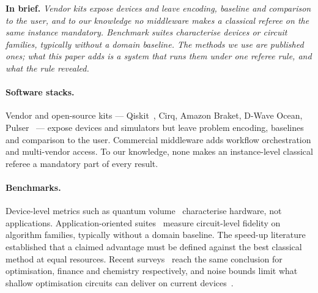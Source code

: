 \documentclass[11pt,a4paper]{article}
\newcommand{\inbrief}[1]{\par\smallskip\noindent\textbf{In brief.} \emph{#1}\par\medskip}
\begin{document}
\inbrief{Vendor kits expose devices and leave encoding, baseline and
comparison to the user, and to our knowledge no middleware makes a classical
referee on the same instance mandatory. Benchmark suites characterise devices
or circuit families, typically without a domain baseline. The methods we use
are published ones; what this paper adds is a system that runs them under
one referee rule, and what the rule revealed.}

\paragraph{Software stacks.}
Vendor and open-source kits --- Qiskit~\cite{javadi2024}, Cirq, Amazon Braket,
D-Wave Ocean, Pulser~\cite{silverio2022} --- expose devices and simulators but
leave problem encoding, baselines and comparison to the user. Commercial
middleware adds workflow orchestration and multi-vendor access. To our
knowledge, none makes an instance-level classical referee a mandatory part of
every result.

\paragraph{Benchmarks.}
Device-level metrics such as quantum volume~\cite{cross2019} characterise
hardware, not applications. Application-oriented suites~\cite{lubinski2023,tomesh2022}
measure circuit-level fidelity on algorithm families, typically without a
domain baseline. The speed-up literature~\cite{ronnow2014} established that
a claimed advantage must be defined against the best classical method at
equal resources. Recent surveys~\cite{abbas2024,herman2023,lee2023} reach the
same conclusion for optimisation, finance and chemistry respectively, and
noise bounds limit what shallow optimisation circuits can deliver on current
devices~\cite{stilck2021}.
\end{document}
